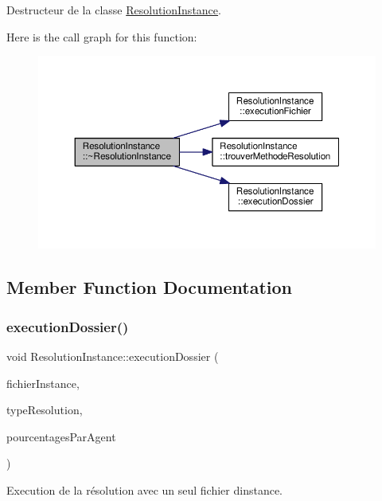 Destructeur de la classe \hyperlink{classResolutionInstance}{Resolution\+Instance}. 

Here is the call graph for this function\+:\nopagebreak
\begin{figure}[H]
\begin{center}
\leavevmode
\includegraphics[width=350pt]{classResolutionInstance_acbc867c1e869aafcb0c20a5698e00aee_cgraph}
\end{center}
\end{figure}


\subsection{Member Function Documentation}
\mbox{\label{classResolutionInstance_a741ee2ea81859379e1418974029f9699}} 
\subsubsection{\texorpdfstring{execution\+Dossier()}{executionDossier()}}
{\footnotesize\ttfamily void Resolution\+Instance\+::execution\+Dossier (\begin{DoxyParamCaption}\item[{Q\+String}]{fichier\+Instance,  }\item[{Q\+String}]{type\+Resolution,  }\item[{map$<$ unsigned int, unsigned int $>$}]{pourcentages\+Par\+Agent }\end{DoxyParamCaption})}



Execution de la résolution avec un seul fichier d\textquotesingle{}instance. 


